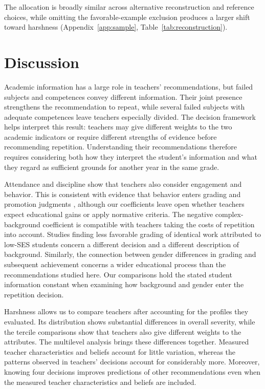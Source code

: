 The allocation is broadly similar across alternative reconstruction and reference choices, while omitting the favorable-example exclusion produces a larger shift toward harshness (Appendix~\ref{app:sample}, Table~\ref{tab:reconstruction}).

\section{Discussion}\label{sec:discussion}
Academic information has a large role in teachers' recommendations, but failed subjects and competences convey different information. Their joint presence strengthens the recommendation to repeat, while several failed subjects with adequate competences leave teachers especially divided. The decision framework helps interpret this result: teachers may give different weights to the two academic indicators or require different strengths of evidence before recommending repetition. Understanding their recommendations therefore requires considering both how they interpret the student's information and what they regard as sufficient grounds for another year in the same grade.

Attendance and discipline show that teachers also consider engagement and behavior. This is consistent with evidence that behavior enters grading and promotion judgments \citep{ferman}, although our coefficients leave open whether teachers expect educational gains or apply normative criteria. The negative complex-background coefficient is compatible with teachers taking the costs of repetition into account. Studies finding less favorable grading of identical work attributed to low-SES students \citep{doyle} concern a different decision and a different description of background. Similarly, the connection between gender differences in grading and subsequent achievement \citep{terrier} concerns a wider educational process than the recommendations studied here. Our comparisons hold the stated student information constant when examining how background and gender enter the repetition decision.

Harshness allows us to compare teachers after accounting for the profiles they evaluated. Its distribution shows substantial differences in overall severity, while the tercile comparisons show that teachers also give different weights to the attributes. The multilevel analysis brings these differences together. Measured teacher characteristics and beliefs account for little variation, whereas the patterns observed in teachers' decisions account for considerably more. Moreover, knowing four decisions improves predictions of other recommendations even when the measured teacher characteristics and beliefs are included.

